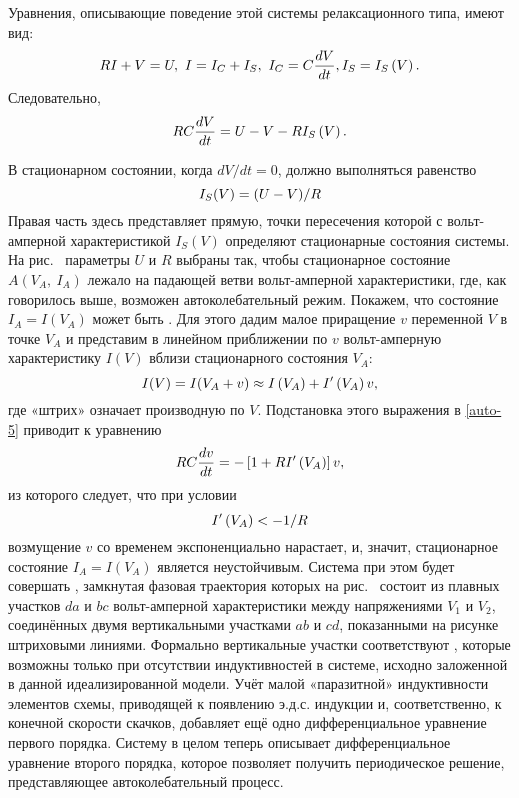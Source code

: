 
Уравнения, описывающие поведение этой системы релаксационного типа,
имеют вид:
\begin{equation} 
	\eqmark{auto-4}
	RI+V=U,~ I=I_C+I_S,~ I_C=C\frac{dV}{dt}, I_S=I_S\left( V \right). 
\end{equation}
Следовательно,
\begin{equation} 
	\eqmark{auto-5}
	RC\frac{dV}{dt}=U-V-R{{I}_{S}}\left( V \right).
\end{equation}

В стационарном состоянии, когда $dV / dt = 0$, должно выполняться равенство
\begin{equation}
	\eqmark{auto-6}
	I_S(V)=(U-V)/R 
\end{equation}
Правая часть здесь представляет  прямую, точки пересечения которой с вольт-амперной характеристикой ${{I}_{S}}\left( V \right)$ определяют стационарные состояния системы. На рис.~ параметры $U$ и $R$ выбраны так, чтобы стационарное состояние $A(V_A,~I_A)$ лежало на падающей ветви вольт-амперной характеристики, где, как говорилось выше, возможен
автоколебательный режим. Покажем, что состояние $I_A=I(V_A)$ может быть . Для этого дадим малое приращение $v$ переменной $V$ в точке
$V_A$ и представим в линейном приближении по $v$ вольт-амперную характеристику $I(V)$ вблизи стационарного состояния $V_A$:
\begin{equation} 
	\eqmark{auto-7}
	I(V)=I(V_A + v)\approx I\left( V_A \right)+{I}'\left( V_A \right)v, 
\end{equation}
где «штрих» означает производную по $V$. Подстановка этого выражения в \eqref{auto-5} приводит к уравнению
\begin{equation} 
	\eqmark{auto-8}
	RC\frac{dv}{dt}=-\left[ 1+R{I}'\left( V_A \right) \right]v, 
\end{equation}
из которого следует, что при условии
\begin{equation} 
	\eqmark{auto-9}
	I'\left( V_A \right) <- {1}/{R}
\end{equation}
возмущение $v$ со временем экспоненциально нарастает, и, значит, стационарное состояние $I_A=I(V_A)$ является неустойчивым. Система при этом будет совершать , замкнутая фазовая траектория которых на рис.~ состоит из плавных участков $da$ и $bc$ вольт-амперной характеристики между напряжениями $V_1$ и $V_2$, соединённых двумя вертикальными участками $ab$ и $cd$, показанными на рисунке штриховыми линиями. Формально вертикальные участки соответствуют , которые возможны только при отсутствии индуктивностей в системе, исходно заложенной в данной идеализированной модели. Учёт малой «паразитной» индуктивности элементов схемы, приводящей к появлению э.д.с. индукции и, соответственно, к конечной скорости скачков, добавляет ещё одно дифференциальное уравнение первого порядка. Систему в целом теперь описывает дифференциальное уравнение второго порядка, которое позволяет получить периодическое решение, представляющее автоколебательный процесс.
